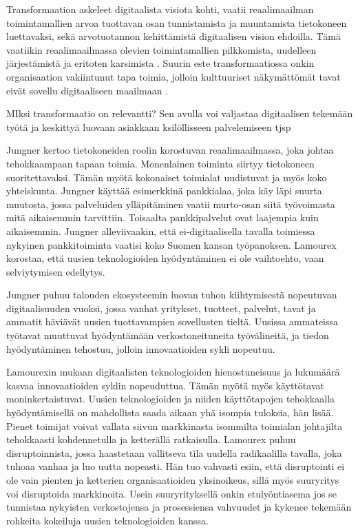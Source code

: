 \documentclass[finnish,12pt,a4paper,pdftex]{article}
\begin{document}
Transformaation askeleet digitaalista visiota kohti, vaatii reaalimaailman toimintamallien arvoa tuottavan osan tunnistamista ja muuntamista tietokoneen luettavaksi, sekä arvotuotannon kehittämistä digitaalisen vision ehdoilla. Tämä vaatiikin reaalimaailmassa olevien toimintamallien pilkkomista, uudelleen järjestämistä ja eritoten karsimista \citep{leanit}. Suurin este transformaatiossa onkin organisaation vakiintunut tapa toimia, jolloin kulttuuriset näkymättömät tavat eivät sovellu digitaaliseen maailmaan \citep{jungner, lamoureux}.

MIksi transformaatio on relevantti? Sen avulla voi valjastaa digitaalisen tekemään työtä ja keskittyä luovaan asiakkaan ksilöllisseen palvelemiseen tjsp

Jungner \citeyearpar{jungner} kertoo tietokoneiden roolin korostuvan reaalimaailmassa, joka johtaa tehokkaampaan tapaan toimia. Monenlainen toiminta siirtyy tietokoneen suoritettavaksi. Tämän myötä kokonaiset toimialat uudistuvat ja myös koko yhteiskunta. Jungner käyttää esimerkkinä pankkialaa, joka käy läpi suurta muutosta, jossa palveluiden ylläpitäminen vaatii murto-osan siitä työvoimasta mitä aikaisemmin tarvittiin. Toisaalta pankkipalvelut ovat laajempia kuin aikaisemmin. Jungner alleviivaakin, että ei-digitaalisella tavalla toimiessa nykyinen pankkitoiminta vaatisi koko Suomen kansan työpanoksen. Lamourex \citeyearpar{lamoureux} korostaa, että
uusien teknologioiden hyödyntäminen ei ole vaihtoehto, vaan selviytymisen edellytys.

Jungner \citeyearpar{jungner} puhuu talouden ekosysteemin luovan tuhon kiihtymisestä nopeutuvan digitaalisuuden vuoksi, jossa vanhat yritykset, tuotteet, palvelut, tavat ja ammatit häviävät uusien tuottavampien sovellusten tieltä. Uusissa ammateissa työtavat muuttuvat hyödyntämään verkostoneituneita työvälineitä, ja tiedon hyödyntäminen tehostuu, jolloin innovaatioiden sykli nopeutuu. 

Lamourexin \citeyearpar{lamoureux} mukaan digitaalisten teknologioiden hienostuneisuus ja lukumäärä kasvaa innovaatioiden syklin nopeuduttua. Tämän myötä myös käyttötavat moninkertaistuvat. Uusien teknologioiden ja niiden käyttötapojen tehokkaalla hyödyntämisellä on mahdollista saada aikaan yhä isompia tuloksia, hän lisää. Pienet toimijat voivat vallata siivun markkinasta isommilta toimialan johtajilta tehokkaasti kohdennetulla ja ketterällä ratkaisulla. Lamourex \citeyearpar{lamoureux} puhuu disruptoinnista, jossa haastetaan vallitseva tila uudella radikaalilla tavalla, joka tuhoaa vanhaa ja luo uutta nopeasti. Hän tuo vahvasti esiin, että disruptointi ei ole vain pienten ja ketterien organisaatioiden yksinoikeus, sillä myös suuryritys voi disruptoida markkinoita. Usein suuryrityksellä onkin etulyöntiasema jos se tunnistaa nykyisten verkostojensa ja prosessiensa vahvuudet ja kykenee tekemään rohkeita kokeiluja uusien teknologioiden kanssa. 
\end{document}
